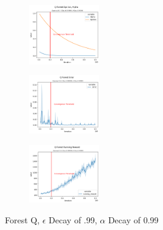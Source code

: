 \documentclass[letterpaper]{article} %
\begin{document}
\begin{figure}[!htb]
	\centering
 	\begin{subfigure}[b]{0.175\textwidth}
		\includegraphics[width=1.2in]{Figures/Q_Forest_Epsilon__Alpha_Gamma_0_9__E_Dec_0_999998__A_Dec_0_99999.png}
  	\end{subfigure}%
	 \begin{subfigure}[b]{0.175\textwidth}
		\includegraphics[width=1.2in]{Figures/Q_Forest_Error_Gamma_0_9__E_Dec_0_999998__A_Dec_0_99999.png}
  	\end{subfigure}%
	\begin{subfigure}[b]{0.175\textwidth}
		\includegraphics[width=1.2in]{Figures/Q_Forest_Running_Reward_Gamma_0_9__E_Dec_0_999998__A_Dec_0_99999.png}
  	\end{subfigure}
\caption{Forest Q,  $\epsilon$ Decay of .99, $\alpha$ Decay of 0.99}
\label{fig:forest_q_e_999998_a_99999_rewards}
\end{figure}
\end{document}
